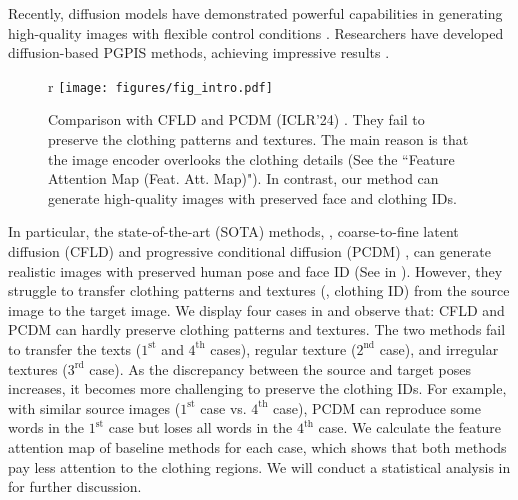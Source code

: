Recently, diffusion models have demonstrated powerful capabilities in generating high-quality images \cite{ho2020denoising,song2020score} with flexible control conditions \cite{rombach2022high}.
%
Researchers have developed diffusion-based PGPIS methods, achieving impressive results \cite{bhunia2023person,lu2024coarse,shen2024advancing}.
%
\begin{figure}{r}{}
    \centering
    \texttt{[image: figures/fig\_intro.pdf]}
    \caption{Comparison with CFLD  \cite{lu2024coarse} and PCDM (ICLR'24) \cite{shen2024advancing}. They fail to preserve the clothing patterns and textures. The main reason is that the image encoder overlooks the clothing details (See the ``Feature Attention Map (Feat. Att. Map)").  In contrast, our method can generate high-quality images with preserved face and clothing IDs.}
    \label{fig:fig_intro}
\end{figure}
%
In particular, the state-of-the-art (SOTA) methods, \eg, coarse-to-fine latent diffusion (CFLD) \cite{lu2024coarse} and progressive conditional diffusion (PCDM) \cite{shen2024advancing}, can generate realistic images with preserved human pose and face ID (See in ).
%
However, they struggle to transfer clothing patterns and textures (\ie, clothing ID) from the source image to the target image.
%
%
We display four cases in  and observe that:  CFLD and PCDM can hardly preserve clothing patterns and textures. The two methods fail to transfer the texts ($1^\text{st}$ and $4^\text{th}$ cases), regular texture ($2^\text{nd}$ case), and irregular textures ($3^\text{rd}$ case).
%
%
 As the discrepancy between the source and target poses increases, it becomes more challenging to preserve the clothing IDs. For example, with similar source images ($1^\text{st}$ case vs. $4^\text{th}$ case), PCDM can reproduce some words in the $1^\text{st}$ case but loses all words in the $4^\text{th}$ case.
%
 We calculate the feature attention map of baseline methods for each case, which shows that both methods pay less attention to the clothing regions. We will conduct a statistical analysis in  for further discussion.


